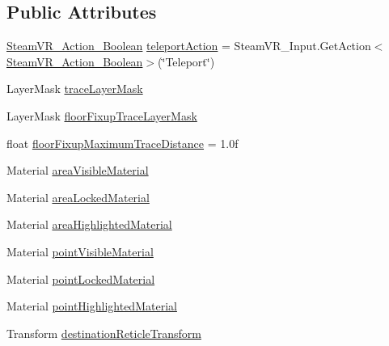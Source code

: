 \subsection*{Public Attributes}
\begin{DoxyCompactItemize}
\item 
\mbox{\hyperlink{class_valve_1_1_v_r_1_1_steam_v_r___action___boolean}{Steam\+V\+R\+\_\+\+Action\+\_\+\+Boolean}} \mbox{\hyperlink{class_valve_1_1_v_r_1_1_interaction_system_1_1_teleport_acdb5577648e257aae5a7aa180630c5ed}{teleport\+Action}} = Steam\+V\+R\+\_\+\+Input.\+Get\+Action$<$\mbox{\hyperlink{class_valve_1_1_v_r_1_1_steam_v_r___action___boolean}{Steam\+V\+R\+\_\+\+Action\+\_\+\+Boolean}}$>$(\char`\"{}Teleport\char`\"{})
\item 
Layer\+Mask \mbox{\hyperlink{class_valve_1_1_v_r_1_1_interaction_system_1_1_teleport_a8b86ab654345c478a2c06cf3cc14eca8}{trace\+Layer\+Mask}}
\item 
Layer\+Mask \mbox{\hyperlink{class_valve_1_1_v_r_1_1_interaction_system_1_1_teleport_a06650b7911b7c075da8415a25fd81d2f}{floor\+Fixup\+Trace\+Layer\+Mask}}
\item 
float \mbox{\hyperlink{class_valve_1_1_v_r_1_1_interaction_system_1_1_teleport_a6dc46fd54e6913bf76c002515ca904f2}{floor\+Fixup\+Maximum\+Trace\+Distance}} = 1.\+0f
\item 
Material \mbox{\hyperlink{class_valve_1_1_v_r_1_1_interaction_system_1_1_teleport_a11a66b6491fd7abcc0ad7fc88158ace0}{area\+Visible\+Material}}
\item 
Material \mbox{\hyperlink{class_valve_1_1_v_r_1_1_interaction_system_1_1_teleport_afe6a97e3596199d6ed620b22e8b25eea}{area\+Locked\+Material}}
\item 
Material \mbox{\hyperlink{class_valve_1_1_v_r_1_1_interaction_system_1_1_teleport_a10b1fd1f658778f146e8a47e8f799a6b}{area\+Highlighted\+Material}}
\item 
Material \mbox{\hyperlink{class_valve_1_1_v_r_1_1_interaction_system_1_1_teleport_ad6f50927a9a3b3fa6129f0835be8ca57}{point\+Visible\+Material}}
\item 
Material \mbox{\hyperlink{class_valve_1_1_v_r_1_1_interaction_system_1_1_teleport_a982ea80a754876a05c803d25bf99a55d}{point\+Locked\+Material}}
\item 
Material \mbox{\hyperlink{class_valve_1_1_v_r_1_1_interaction_system_1_1_teleport_a0edcde5fd07ace591801b485f35e0858}{point\+Highlighted\+Material}}
\item 
Transform \mbox{\hyperlink{class_valve_1_1_v_r_1_1_interaction_system_1_1_teleport_a64f1404a754df096205f5d3b0ca6f276}{destination\+Reticle\+Transform}}

\end{DoxyCompactItemize}
